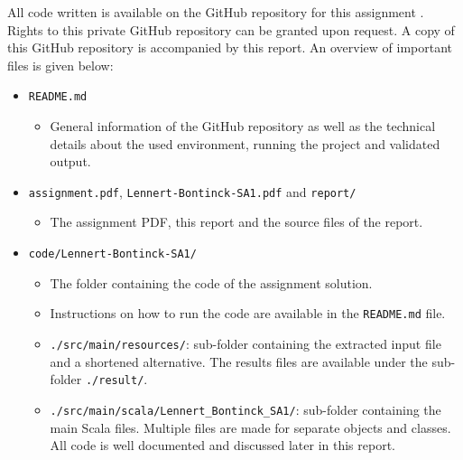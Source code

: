 All code written is available on the GitHub repository for this assignment \citep{github_project}. 
Rights to this private GitHub repository can be granted upon request. 
A copy of this GitHub repository is accompanied by this report.
An overview of important files is given below:
\begin{itemize}
    \item \texttt{README.md}
    \begin{itemize}
        \item General information of the GitHub repository as well as the technical details about the used environment, running the project and validated output.
    \end{itemize}
    \item \texttt{assignment.pdf}, \texttt{Lennert-Bontinck-SA1.pdf} and \texttt{report/}
    \begin{itemize}
        \item The assignment PDF, this report and the source files of the report.
    \end{itemize}
    \item \texttt{code/Lennert-Bontinck-SA1/}
    \begin{itemize}
        \item The folder containing the code of the assignment solution.
        \item Instructions on how to run the code are available in the \texttt{README.md} file.
        \item \texttt{./src/main/resources/}: sub-folder containing the extracted input file and a shortened alternative. The results files are available under the sub-folder \texttt{./result/}.
        \item \texttt{./src/main/scala/Lennert\_Bontinck\_SA1/}: sub-folder containing the main Scala files. Multiple files are made for separate objects and classes. All code is well documented and discussed later in this report.
    \end{itemize}
\end{itemize}


